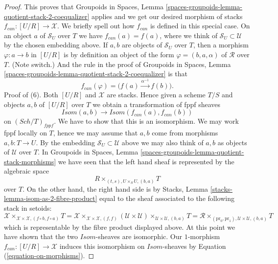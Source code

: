 \documentclass{stacks-project}
\theoremstyle{plain}
\theoremstyle{definition}
\theoremstyle{remark}
\numberwithin{equation}{subsection}
\def\Sch{\mathit{Sch}}
\begin{document}
\begin{proof}
\medskip\noindent
This proves that
Groupoids in Spaces,
Lemma \ref{spaces-groupoids-lemma-quotient-stack-2-coequalizer}
applies and we get our desired morphism of stacks
$f_{can} : [U/R] \to \mathcal{X}$. We briefly spell out how
$f_{can}$ is defined in this special case.
On an object $a$ of $\mathcal{S}_U$ over $T$
we have $f_{can}(a) = f(a)$, where we think of
$\mathcal{S}_U \subset \mathcal{U}$ by the chosen embedding above.
If $a, b$ are objects of $\mathcal{S}_U$ over $T$, then a morphism
$\varphi : a \to b$ in $[U/R]$ is by definition an object of the
form $\varphi = (b, a, \alpha)$ of $\mathcal{R}$ over $T$. (Note
switch.) And the rule in the proof of
Groupoids in Spaces,
Lemma \ref{spaces-groupoids-lemma-quotient-stack-2-coequalizer}
is that
\begin{equation}
\label{equation-on-morphisms}
f_{can}(\varphi) = \Big(f(a) \xrightarrow{\alpha^{-1}} f(b)\Big).
\end{equation}
Proof of (6). Both $[U/R]$ and $\mathcal{X}$ are stacks.
Hence given a scheme $T/S$ and objects $a, b$ of $[U/R]$
over $T$ we obtain a transformation of fppf sheaves
$$
\mathit{Isom}(a, b) \longrightarrow \mathit{Isom}(f_{can}(a), f_{can}(b))
$$
on $(\Sch/T)_{fppf}$. We have to show that this is an
isomorphism. We may work fppf locally on $T$, hence we may assume that
$a, b$ come from morphisms $a, b : T \to U$. By the embedding
$\mathcal{S}_U \subset \mathcal{U}$ above we may also think of $a, b$ as
objects of $\mathcal{U}$ over $T$. In
Groupoids in Spaces,
Lemma \ref{spaces-groupoids-lemma-quotient-stack-morphisms}
we have seen that the left hand sheaf is represented by the algebraic space
$$
R \times_{(t, s), U \times_S U, (b, a)} T
$$
over $T$. On the other hand, the right hand side is by
Stacks, Lemma \ref{stacks-lemma-isom-as-2-fibre-product}
equal to the sheaf associated to the following stack in setoids:
$$
\mathcal{X}
\times_{\mathcal{X} \times \mathcal{X}, (f \circ b, f \circ a)} T =
\mathcal{X}
\times_{\mathcal{X} \times \mathcal{X}, (f, f)}
(\mathcal{U} \times \mathcal{U})
\times_{\mathcal{U} \times \mathcal{U}, (b, a)} T =
\mathcal{R}
\times_{(\text{pr}_0, \text{pr}_1), \mathcal{U} \times \mathcal{U}, (b, a)} T
$$
which is representable by the fibre product displayed above.
At this point we have shown that the two $\mathit{Isom}$-sheaves
are isomorphic. Our $1$-morphism $f_{can} : [U/R] \to \mathcal{X}$ induces
this isomorphism on $\mathit{Isom}$-sheaves by
Equation (\ref{equation-on-morphisms}).
\end{proof}
\end{document}
